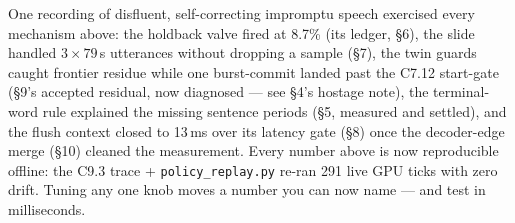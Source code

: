 \documentclass[11pt]{article}
\begin{document}
One recording of disfluent, self-correcting impromptu speech exercised every
mechanism above: the holdback valve fired at 8.7\% (its ledger, \S6), the slide
handled $3\times79$\,s utterances without dropping a sample (\S7), the twin
guards caught frontier residue while one burst-commit landed past the C7.12
start-gate (\S9's accepted residual, now diagnosed --- see \S4's hostage note),
the terminal-word rule explained the missing sentence periods (\S5, measured
and settled), and the flush context closed to 13\,ms over its latency gate
(\S8) once the decoder-edge merge (\S10) cleaned the measurement. Every number
above is now reproducible offline: the C9.3 trace + \texttt{policy\_replay.py}
re-ran 291 live GPU ticks with zero drift. Tuning any one knob moves a number
you can now name --- and test in milliseconds.
\end{document}
